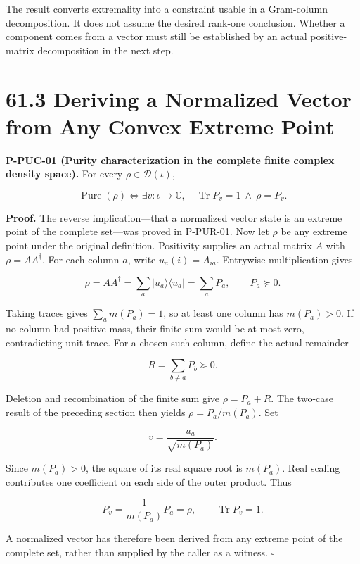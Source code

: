 \documentclass[
  11pt,
  oneside]{book}
\begin{document}
The result converts extremality into a constraint usable in a
Gram-column decomposition. It does not assume the desired rank-one
conclusion. Whether a component comes from a vector must still be
established by an actual positive-matrix decomposition in the next step.

\section{61.3 Deriving a Normalized Vector from Any Convex Extreme
Point}

\label{p-puc-01}{}

\textbf{P-PUC-01 (Purity characterization in the complete finite complex
density space).} For every \(\rho\in\mathcal D(\iota)\),

\[
\operatorname{Pure}(\rho)
\iff
\exists v:\iota\to\mathbb C,\quad
\operatorname{Tr}P_v=1\ \land\ \rho=P_v.
\]

\textbf{Proof.} The reverse implication---that a normalized vector state
is an extreme point of the complete set---was proved in P-PUR-01. Now
let \(\rho\) be any extreme point under the original definition.
Positivity supplies an actual matrix \(A\) with \(\rho=AA^\dagger\). For
each column \(a\), write \(u_a(i)=A_{ia}\). Entrywise multiplication
gives

\[
\rho=AA^\dagger=\sum_a |u_a\rangle\langle u_a|
=\sum_a P_a,\qquad P_a\succeq0.
\]

Taking traces gives \(\sum_a m(P_a)=1\), so at least one column has
\(m(P_a)>0\). If no column had positive mass, their finite sum would be
at most zero, contradicting unit trace. For a chosen such column, define
the actual remainder

\[
R=\sum_{b\ne a}P_b\succeq0.
\]

Deletion and recombination of the finite sum give \(\rho=P_a+R\). The
two-case result of the preceding section then yields
\(\rho=P_a/m(P_a)\). Set

\[
v=\frac{u_a}{\sqrt{m(P_a)}}.
\]

Since \(m(P_a)>0\), the square of its real square root is \(m(P_a)\).
Real scaling contributes one coefficient on each side of the outer
product. Thus

\[
P_v=\frac1{m(P_a)}P_a=\rho,
\qquad\operatorname{Tr}P_v=1.
\]

A normalized vector has therefore been derived from any extreme point of
the complete set, rather than supplied by the caller as a witness.
\(\square\)
\end{document}
